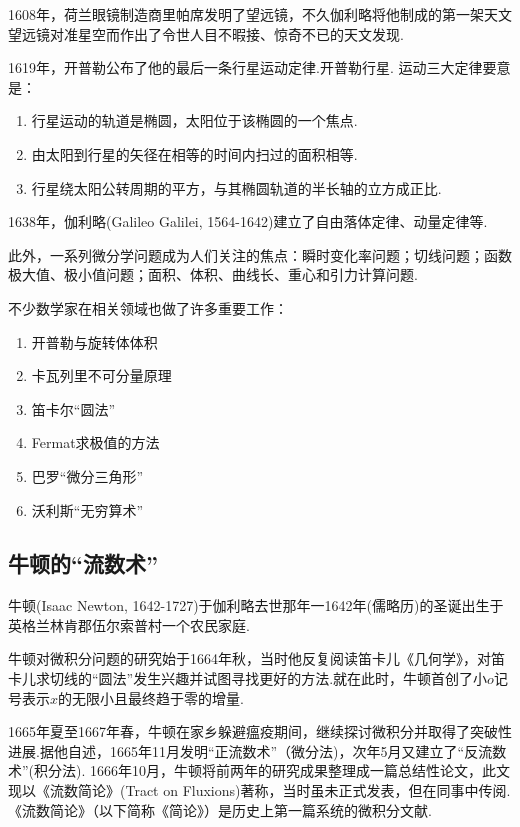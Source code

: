 \documentclass{Math_Note}
\begin{document}
1608年，荷兰眼镜制造商里帕席发明了望远镜，不久伽利略将他制成的第一架天文望远镜对准星空而作出了令世人目不暇接、惊奇不已的天文发现.

1619年，开普勒公布了他的最后一条行星运动定律.开普勒行星. 运动三大定律要意是：

\begin{enumerate}
    \item 行星运动的轨道是椭圆，太阳位于该椭圆的一个焦点. 
    \item 由太阳到行星的矢径在相等的时间内扫过的面积相等. 
    \item 行星绕太阳公转周期的平方，与其椭圆轨道的半长轴的立方成正比. 
\end{enumerate}

1638年，伽利略(Galileo Galilei, 1564-1642)建立了自由落体定律、动量定律等. 

此外，一系列微分学问题成为人们关注的焦点：瞬时变化率问题；切线问题；函数极大值、极小值问题；面积、体积、曲线长、重心和引力计算问题.

不少数学家在相关领域也做了许多重要工作：

\begin{enumerate}
    \item 开普勒与旋转体体积
    \item 卡瓦列里不可分量原理
    \item 笛卡尔“圆法”
    \item Fermat求极值的方法
    \item 巴罗“微分三角形”
    \item 沃利斯“无穷算术”
\end{enumerate}

\subsection{牛顿的“流数术”}

牛顿(Isaac Newton, 1642-1727)于伽利略去世那年一1642年(儒略历)的圣诞出生于英格兰林肯郡伍尔索普村一个农民家庭. 

牛顿对微积分问题的研究始于1664年秋，当时他反复阅读笛卡儿《几何学》，对笛卡儿求切线的“圆法”发生兴趣并试图寻找更好的方法.就在此时，牛顿首创了小$o$记号表示$x$的无限小且最终趋于零的增量.

1665年夏至1667年春，牛顿在家乡躲避瘟疫期间，继续探讨微积分并取得了突破性进展.据他自述，1665年11月发明“正流数术”（微分法)，次年5月又建立了“反流数术”(积分法).
1666年10月，牛顿将前两年的研究成果整理成一篇总结性论文，此文现以《流数简论》(Tract on Fluxions)著称，当时虽未正式发表，但在同事中传阅.《流数简论》（以下简称《简论》）是历史上第一篇系统的微积分文献.
\end{document}
